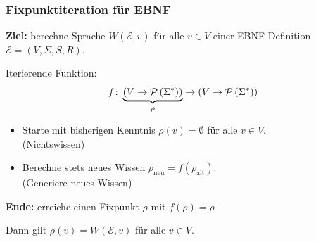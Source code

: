 \documentclass{beamer}
\begin{document}
\begin{frame} \frametitle{Fixpunktiteration für EBNF}
	\small
	\textbf{Ziel:} berechne Sprache $W(\mathcal{E}, v)$ für alle $v \in V$ einer EBNF-Definition $\mathcal{E} = (V, \Sigma, S, R)$.
	
	\pause
	Iterierende Funktion:
	\begin{equation*}
		f \colon \underbrace{\left( V \to \mathcal{P}\left( \Sigma^\ast \right) \right)}_{\rho} \to \left( V \to \mathcal{P}\left( \Sigma^\ast \right) \right)
	\end{equation*}
	
	\begin{itemize}
		\item Starte mit bisherigen Kenntnis $\rho(v) = \emptyset$ für alle $v \in V$. \\
		(Nichtswissen)
		\item Berechne stets neues Wissen $\rho_{\text{neu}} = f(\rho_{\text{alt}})$. \\
		(Generiere neues Wissen)
	\end{itemize}

	\pause
	\textbf{Ende:} erreiche einen Fixpunkt $\rho$ mit $f(\rho) = \rho$
	
	Dann gilt $\rho(v) = W(\mathcal{E}, v)$ für alle $v \in V$.
\end{frame}
\end{document}
